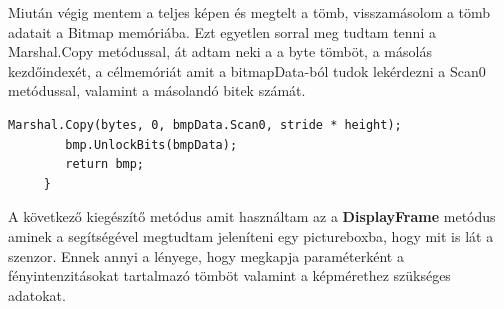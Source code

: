 \documentclass[]{thesis-ekf}
\theoremstyle{definition}
\theoremstyle{remark}
\begin{document}
Miután végig mentem a teljes képen és megtelt a tömb, visszamásolom a tömb adatait a Bitmap memóriába. Ezt egyetlen sorral meg tudtam tenni a Marshal.Copy\cite{marshal.copy} metódussal, át adtam neki a a byte tömböt, a másolás kezdőindexét, a célmemóriát amit a bitmapData-ból tudok lekérdezni a Scan0 metódussal, valamint a másolandó bitek számát.
\begin{lstlisting}[language=CSharp]	
	 	Marshal.Copy(bytes, 0, bmpData.Scan0, stride * height);
	 	bmp.UnlockBits(bmpData);
	 	return bmp;
	 }
\end{lstlisting}
A következő kiegészítő metódus amit használtam az a \textbf{DisplayFrame} metódus aminek a segítségével megtudtam jeleníteni egy pictureboxba, hogy mit is lát a szenzor. Ennek annyi a lényege, hogy megkapja paraméterként a fényintenzitásokat tartalmazó tömböt valamint a képmérethez szükséges adatokat. 
\end{document}
